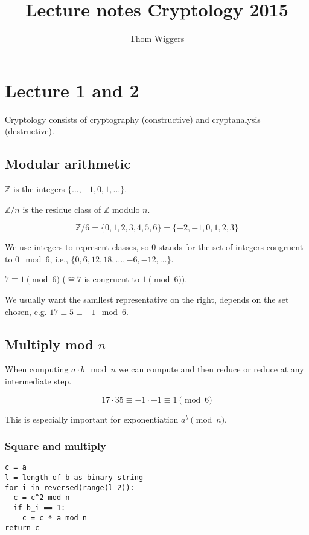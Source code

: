 \documentclass{article}
\author{Thom Wiggers}
\title{Lecture notes Cryptology 2015}
\newcommand{\ZZ}{\mathbb{Z}}
\begin{document}
\maketitle

\section{Lecture 1 and 2}

Cryptology consists of cryptography (constructive) and cryptanalysis (destructive).

\subsection{Modular arithmetic}

$\ZZ$ is the integers $\{\dots, -1, 0, 1, \dots\}$.

$\ZZ/n$ is the residue class of $\ZZ$ modulo $n$.

$$\ZZ/6 = \{0, 1, 2, 3, 4, 5, 6\} = \{-2, -1, 0, 1, 2, 3\}$$

We use integers to represent classes, so $0$ stands for the set of integers
congruent to $0 \mod 6$, i.e., $\{0, 6, 12, 18, \dots, -6, -12, \dots\}$.

$7 \equiv 1 \pmod{6}$ ($\hat{=} 7$ is congruent to $1 \pmod{6})$.

We usually want the samllest representative on the right, depends on the set chosen,
e.g. $17 \equiv 5 \equiv -1 \mod 6$.

\subsection{Multiply mod $n$}

When computing $a \cdot b \mod n$ we can compute and then reduce or reduce at any intermediate
step.

\[ 17 \cdot 35 \equiv -1 \cdot -1 \equiv 1 \pmod{6} \]

This is especially important for exponentiation $a^b \pmod{n}$.

\subsubsection{Square and multiply}

\begin{verbatim}
c = a
l = length of b as binary string
for i in reversed(range(l-2)):
  c = c^2 mod n
  if b_i == 1:
    c = c * a mod n
return c
\end{verbatim}
\end{document}
